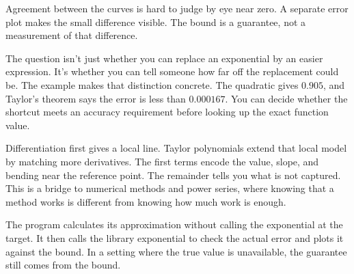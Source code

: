 {
}{Agreement between the curves is hard to judge by eye near zero. A separate error plot makes the small difference visible. The bound is a guarantee, not a measurement of that difference.}

The question isn't just whether you can replace an exponential by an easier expression. It's whether you can tell someone how far off the replacement could be. The example makes that distinction concrete. The quadratic gives \(0.905\), and Taylor's theorem says the error is less than \(0.000167\). You can decide whether the shortcut meets an accuracy requirement before looking up the exact function value.

Differentiation first gives a local line. Taylor polynomials extend that local model by matching more derivatives. The first terms encode the value, slope, and bending near the reference point. The remainder tells you what is not captured. This is a bridge to numerical methods and power series, where knowing that a method works is different from knowing how much work is enough.

The program calculates its approximation without calling the exponential at the target. It then calls the library exponential to check the actual error and plots it against the bound. In a setting where the true value is unavailable, the guarantee still comes from the bound.

